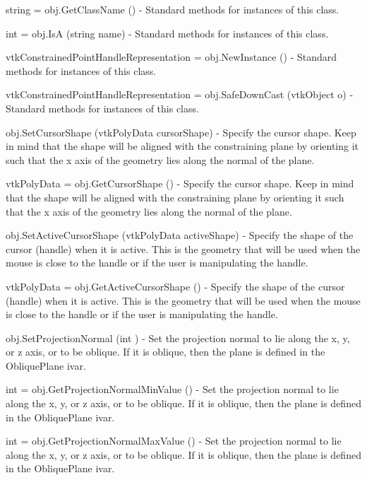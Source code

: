 \begin{DoxyItemize}
\item {\ttfamily string = obj.\-Get\-Class\-Name ()} -\/ Standard methods for instances of this class.  
\item {\ttfamily int = obj.\-Is\-A (string name)} -\/ Standard methods for instances of this class.  
\item {\ttfamily vtk\-Constrained\-Point\-Handle\-Representation = obj.\-New\-Instance ()} -\/ Standard methods for instances of this class.  
\item {\ttfamily vtk\-Constrained\-Point\-Handle\-Representation = obj.\-Safe\-Down\-Cast (vtk\-Object o)} -\/ Standard methods for instances of this class.  
\item {\ttfamily obj.\-Set\-Cursor\-Shape (vtk\-Poly\-Data cursor\-Shape)} -\/ Specify the cursor shape. Keep in mind that the shape will be aligned with the constraining plane by orienting it such that the x axis of the geometry lies along the normal of the plane.  
\item {\ttfamily vtk\-Poly\-Data = obj.\-Get\-Cursor\-Shape ()} -\/ Specify the cursor shape. Keep in mind that the shape will be aligned with the constraining plane by orienting it such that the x axis of the geometry lies along the normal of the plane.  
\item {\ttfamily obj.\-Set\-Active\-Cursor\-Shape (vtk\-Poly\-Data active\-Shape)} -\/ Specify the shape of the cursor (handle) when it is active. This is the geometry that will be used when the mouse is close to the handle or if the user is manipulating the handle.  
\item {\ttfamily vtk\-Poly\-Data = obj.\-Get\-Active\-Cursor\-Shape ()} -\/ Specify the shape of the cursor (handle) when it is active. This is the geometry that will be used when the mouse is close to the handle or if the user is manipulating the handle.  
\item {\ttfamily obj.\-Set\-Projection\-Normal (int )} -\/ Set the projection normal to lie along the x, y, or z axis, or to be oblique. If it is oblique, then the plane is defined in the Oblique\-Plane ivar.  
\item {\ttfamily int = obj.\-Get\-Projection\-Normal\-Min\-Value ()} -\/ Set the projection normal to lie along the x, y, or z axis, or to be oblique. If it is oblique, then the plane is defined in the Oblique\-Plane ivar.  
\item {\ttfamily int = obj.\-Get\-Projection\-Normal\-Max\-Value ()} -\/ Set the projection normal to lie along the x, y, or z axis, or to be oblique. If it is oblique, then the plane is defined in the Oblique\-Plane ivar.  

\end{DoxyItemize}
